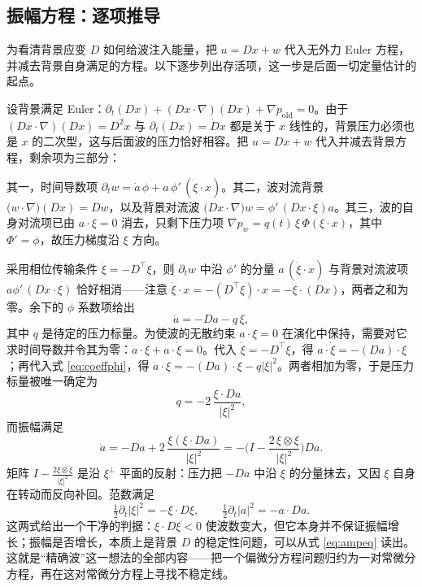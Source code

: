 \subsection{振幅方程：逐项推导}

为看清背景应变 $D$ 如何给波注入能量，把 $u=Dx+w$ 代入无外力 Euler 方程，并减去背景自身满足的方程。以下逐步列出存活项，这一步是后面一切定量估计的起点。

设背景满足 Euler：$\partial_{t}(Dx)+(Dx\cdot\nabla)(Dx)+\nabla p_{\text{old}}=0$。由于 $(Dx\cdot\nabla)(Dx)=D^{2}x$ 与 $\partial_{t}(Dx)=\dot Dx$ 都是关于 $x$ 线性的，背景压力必须也是 $x$ 的二次型，这与后面波的压力恰好相容。把 $u=Dx+w$ 代入并减去背景方程，剩余项为三部分：

其一，时间导数项 $\partial_{t}w=\dot a\,\phi+a\,\phi'\,(\dot\xi\cdot x)$。其二，波对流背景 $\big(w\cdot\nabla\big)(Dx)=Dw$，以及背景对流波 $\big(Dx\cdot\nabla\big)w=\phi'\,(Dx\cdot\xi)a$。其三，波的自身对流项已由 $a\cdot\xi=0$ 消去，只剩下压力项 $\nabla p_{w}=q(t)\,\xi\,\Phi(\xi\cdot x)$，其中 $\Phi'=\phi$，故压力梯度沿 $\xi$ 方向。

采用相位传输条件 $\dot\xi=-D^{\top}\xi$，则 $\partial_{t}w$ 中沿 $\phi'$ 的分量 $a\,(\dot\xi\cdot x)$ 与背景对流波项 $a\phi'\,(Dx\cdot\xi)$ 恰好相消——注意 $\dot\xi\cdot x=-(D^{\top}\xi)\cdot x=-\xi\cdot(Dx)$，两者之和为零。余下的 $\phi$ 系数项给出
\begin{equation}
\dot a=-Da-q\,\xi ,
\label{eq:coeffphi}
\end{equation}
其中 $q$ 是待定的压力标量。为使波的无散约束 $a\cdot\xi=0$ 在演化中保持，需要对它求时间导数并令其为零：$\dot a\cdot\xi+a\cdot\dot\xi=0$。代入 $\dot\xi=-D^{\top}\xi$，得 $a\cdot\dot\xi=-(Da)\cdot\xi$；再代入式 \eqref{eq:coeffphi}，得 $\dot a\cdot\xi=-(Da)\cdot\xi-q|\xi|^{2}$。两者相加为零，于是压力标量被唯一确定为
\begin{equation}
q=-2\,\frac{\xi\cdot Da}{|\xi|^{2}},
\end{equation}
而振幅满足
\begin{equation}
\dot a=-Da+2\,\frac{\xi(\xi\cdot Da)}{|\xi|^{2}}
=-\Big(I-\frac{2\,\xi\otimes\xi}{|\xi|^{2}}\Big)Da.
\label{eq:ampeq}
\end{equation}
矩阵 $I-\frac{2\xi\otimes\xi}{|\xi|^{2}}$ 是沿 $\xi^{\perp}$ 平面的反射：压力把 $-Da$ 中沿 $\xi$ 的分量抹去，又因 $\xi$ 自身在转动而反向补回。范数满足
\begin{equation}
\tfrac12\partial_{t}|\xi|^{2}=-\xi\cdot D\xi,\qquad \tfrac12\partial_{t}|a|^{2}=-a\cdot Da .
\end{equation}
这两式给出一个干净的判据：$\xi\cdot D\xi<0$ 使波数变大，但它本身并不保证振幅增长；振幅是否增长，本质上是背景 $D$ 的稳定性问题，可以从式 \eqref{eq:ampeq} 读出。这就是“精确波”这一想法的全部内容——把一个偏微分方程问题归约为一对常微分方程，再在这对常微分方程上寻找不稳定线。

